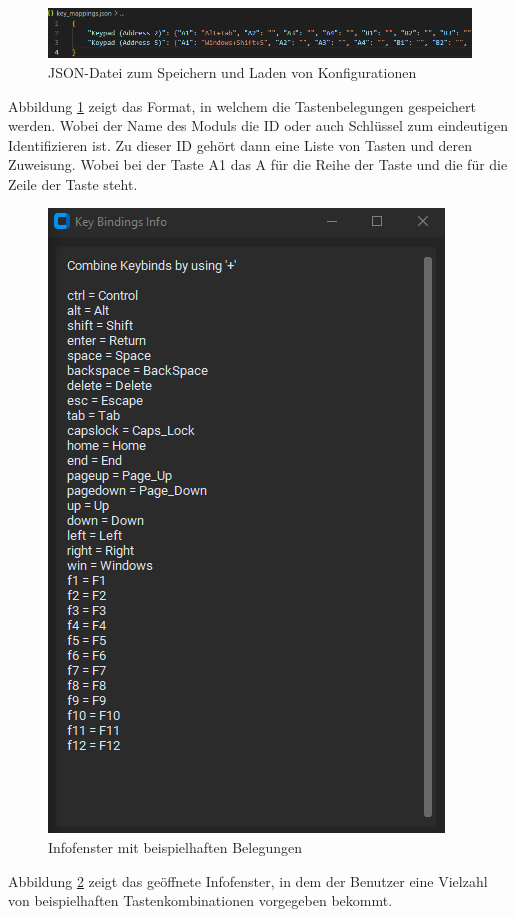 \begin{figure}[H]
	\centering    
	\includegraphics[width=1\textwidth]{Bilder/Save file.png}
	\caption{JSON-Datei zum Speichern und Laden von Konfigurationen}
	\label{Mapper_savefile}
\end{figure}
Abbildung \ref{Mapper_savefile} zeigt das Format, in welchem die Tastenbelegungen gespeichert werden. Wobei der Name des Moduls die ID oder auch \glqq Schlüssel\grqq{} zum eindeutigen Identifizieren ist. Zu dieser ID gehört dann eine Liste von Tasten und deren Zuweisung. Wobei bei der Taste \glqq A1\grqq{} das \glqq A\grqq{} für die Reihe der Taste und die \grqq{} für die Zeile der Taste steht.
\newpage
\begin{figure}[H]
	\centering    
	\includegraphics[width=.6\textwidth]{Bilder/Info_window.png}
	\caption{Infofenster mit beispielhaften Belegungen}
	\label{Mapper_info_window}
\end{figure}
Abbildung \ref{Mapper_info_window} zeigt das geöffnete Infofenster, in dem der Benutzer eine Vielzahl von beispielhaften Tastenkombinationen vorgegeben bekommt.